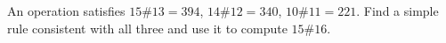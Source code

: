 An operation satisfies $15\#13=394$, $14\#12=340$, $10\#11=221$. Find a simple rule consistent with all three and use it to compute $15\#16$.
